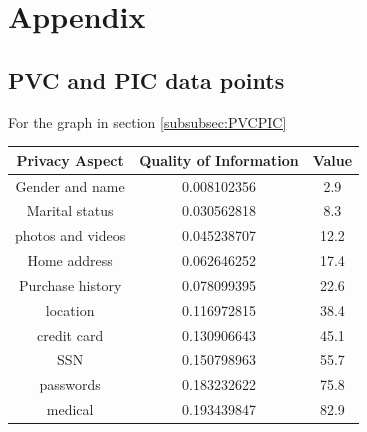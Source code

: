 \documentclass{icmmcm}
\begin{document}



\section{Appendix}
\subsection{PVC and PIC data points}
For the graph in section \ref{subsubsec:PVCPIC}

\begin{center}
\begin{tabular}{ c|c|c } 
 Privacy Aspect & Quality of Information & Value \\ 
 \hline  \hline
 Gender and name          & 0.008102356              & 2.9  \\ 
 Marital status  & 0.030562818          & 8.3  \\
 photos and videos             & 0.045238707                         & 12.2  \\
 Home address          & 0.062646252                & 17.4  \\
 Purchase history       & 0.078099395              & 22.6  \\
 location          & 0.116972815   & 38.4  \\
 credit card          & 0.130906643   & 45.1  \\
 SSN          & 0.150798963   & 55.7  \\
 passwords          & 0.183232622   & 75.8  \\
 medical & 0.193439847 & 82.9
 \end{tabular}
\end{center}

\end{document}
